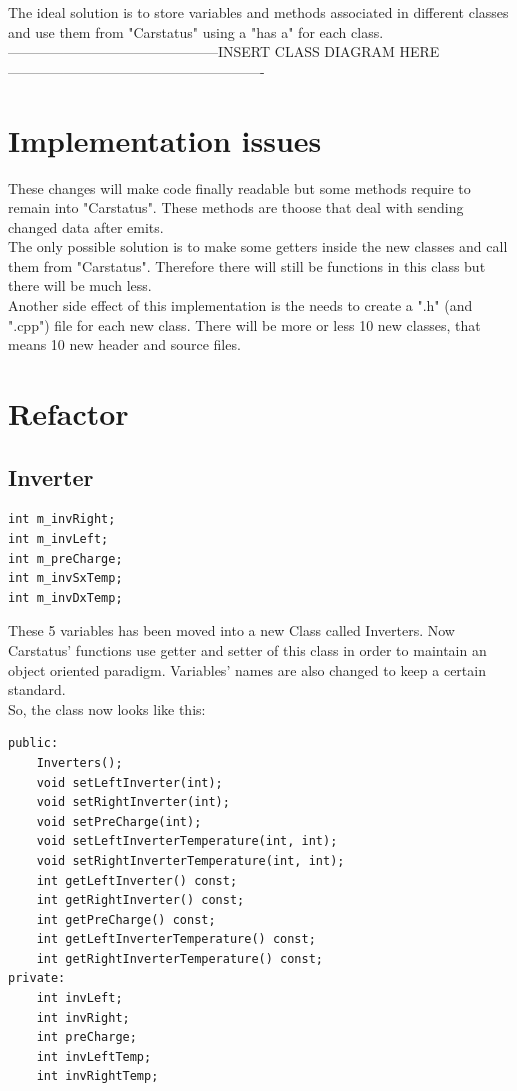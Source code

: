 \documentclass[12pt, letterpaper]{article}
\begin{document}
\begin{flushleft}
\newline
\newline
	The ideal solution is to store variables and methods associated in different classes and use them from "Carstatus" using a "has a" for each class.\\
	---------------------------------------------INSERT CLASS DIAGRAM HERE-------------------------------------------------------

\section{Implementation issues}
	These changes will make code finally readable but some methods require to remain into "Carstatus". These methods are thoose that deal with sending changed data after emits.\\
	The only possible solution is to make some getters inside the new classes and call them from "Carstatus". Therefore there will still be functions in this class but there will be much less.\\
	Another side effect of this implementation is the needs to create a ".h" (and ".cpp") file for each new class. There will be more or less 10 new classes, that means 10 new header and source files.

\section{Refactor}
\subsection{Inverter}
\begin{verbatim}
int m_invRight;
int m_invLeft;
int m_preCharge;
int m_invSxTemp;
int m_invDxTemp;
\end{verbatim}
These 5 variables has been moved into a new Class called Inverters. Now Carstatus' functions use getter and setter of this class in order to maintain an object oriented paradigm. Variables' names are also changed to keep a certain standard.\\
So, the class now looks like this:
\begin{verbatim}
public:
    Inverters();
    void setLeftInverter(int);
    void setRightInverter(int);
    void setPreCharge(int);
    void setLeftInverterTemperature(int, int);
    void setRightInverterTemperature(int, int);
    int getLeftInverter() const;
    int getRightInverter() const;
    int getPreCharge() const;
    int getLeftInverterTemperature() const;
    int getRightInverterTemperature() const;
private:
    int invLeft;
    int invRight;
    int preCharge;
    int invLeftTemp;
    int invRightTemp;
\end{verbatim}


\end{flushleft}
\end{document}
